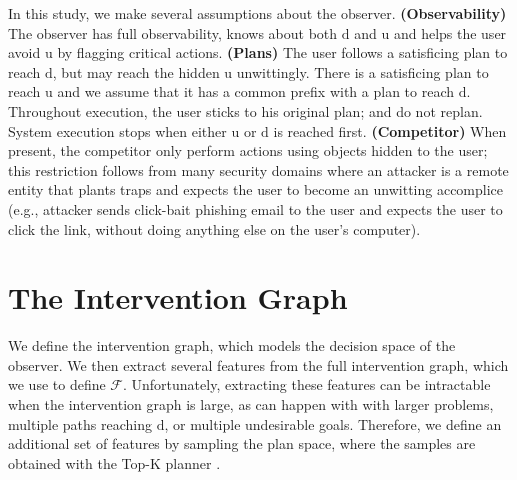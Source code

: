 \documentclass[letterpaper]{article}
\theoremstyle{plain}
\newtheorem{definition}{Definition}
\begin{document}


In this study, we make several assumptions about the observer.
\textbf{(Observability)} 
The observer has full observability, knows about both $\mathrm{d}$ and $\mathrm{u}$ and helps the user avoid $\mathrm{u}$ by flagging critical actions.
\textbf{(Plans)} 
The user follows a satisficing plan to reach $\mathrm{d}$, but may reach the hidden $\mathrm{u}$ unwittingly. 
There is a satisficing plan to reach $\mathrm{u}$ and we assume that it has a common prefix with a plan to reach $\mathrm{d}$. 
Throughout execution, the user sticks to his original plan; and do not replan. System execution stops when either $\mathrm{u}$ or $\mathrm{d}$ is reached first.
\textbf{(Competitor)}
When present, the competitor only perform actions using objects hidden to the user; this restriction follows from many security domains where an attacker is a remote entity that plants traps and expects the user to become an unwitting accomplice (e.g., attacker sends click-bait phishing email to the user and expects the user to click the link, without doing anything else on the user's computer).





\section{The Intervention Graph}
\label{sec:stategraph}
We define the intervention graph, which models the decision space of the observer.
We then extract several features from the full intervention graph, which we use to define $\mathcal{F}$.
Unfortunately, extracting these features can be intractable when the intervention graph is large, as can happen with with larger problems, multiple paths reaching $\mathrm{d}$, or multiple undesirable goals. Therefore, we define an additional set of features by sampling the plan space, where the samples are obtained with the Top-K planner \cite{riabov2014}.
\end{document}

